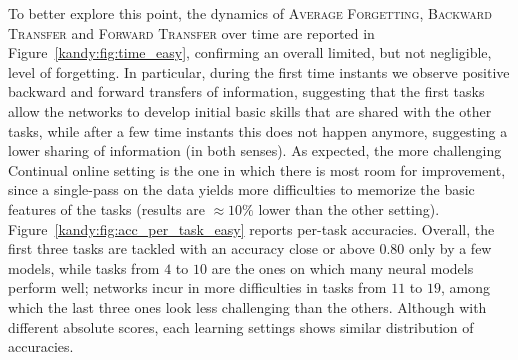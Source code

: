 To better explore this point, the dynamics of \textsc{Average Forgetting}, \textsc{Backward Transfer} and \textsc{Forward Transfer} over time are reported in Figure~\ref{kandy:fig:time_easy}, confirming an overall limited, but not negligible, level of forgetting. In particular, during the first time instants we observe positive backward and forward transfers of information, suggesting that the first tasks allow the networks to develop initial basic skills that are shared with the other tasks, while after a few time instants this does not happen anymore, suggesting a lower sharing of information (in both senses). %
As expected, the more challenging {\sc\small Continual online} setting is the one in which there is most room for improvement, since a single-pass on the data yields more difficulties to memorize the basic features of the tasks (results are $\approx 10\%$ lower than the other setting).
Figure~\ref{kandy:fig:acc_per_task_easy} reports per-task accuracies. Overall, the first three tasks are tackled with an accuracy close or above $0.80$ only by a few models, while tasks from $4$ to $10$ are the ones on which many neural models perform well; networks incur in more difficulties in tasks from $11$ to $19$, among which the last three ones look less challenging than the others. Although with different absolute scores, each learning settings shows similar distribution of accuracies. %

